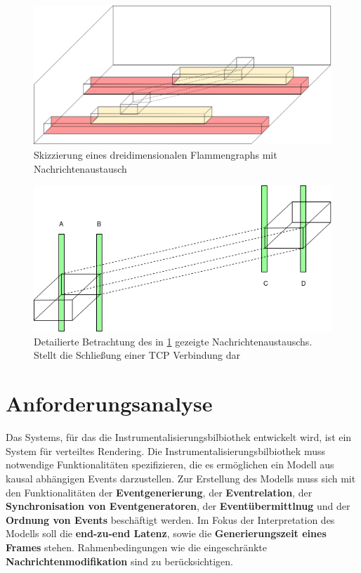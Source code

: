 \begin{figure}[!ht]
	\centering
	\includegraphics[scale=0.3]{img/Problembeschreibung/flamegraph_3D.png}
	\caption[3D Flammengraph]{Skizzierung eines dreidimensionalen Flammengraphs mit Nachrichtenaustausch}
	\label{fig:flamegraph_3D}
\end{figure}

\begin{figure}[!ht]
	\centering
	\includegraphics[scale=0.5]{img/Problembeschreibung/flamegraph_3D_closing.png}
	\caption[Flammengraph TCP schließung]{Detailierte Betrachtung des in \cref{fig:flamegraph_3D} gezeigte Nachrichtenaustauschs. Stellt die Schließung einer TCP Verbindung dar}
	\label{fig:flamegraph_3D_closing}
\end{figure}

\section{Anforderungsanalyse}
\label{section:Anforderungsanalyse}

Das Systems, für das die Instrumentalisierungsbilbiothek entwickelt wird, ist ein System für verteiltes Rendering. Die Instrumentalisierungsbilbiothek muss notwendige Funktionalitäten spezifizieren, die es ermöglichen ein Modell aus kausal abhängigen Events darzustellen. Zur Erstellung des Modells muss sich mit den Funktionalitäten der \textbf{Eventgenerierung}, der \textbf{Eventrelation}, der \textbf{Synchronisation von Eventgeneratoren}, der \textbf{Eventübermittlnug} und der \textbf{Ordnung von Events} beschäftigt werden. Im Fokus der Interpretation des Modells soll die \textbf{end-zu-end Latenz}, sowie die \textbf{Generierungszeit eines Frames} stehen. Rahmenbedingungen wie die eingeschränkte \textbf{Nachrichtenmodifikation} sind zu berücksichtigen.

